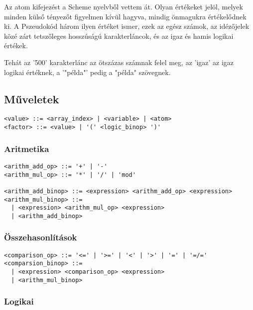 Az atom kifejezést a Scheme nyelvből vettem át. Olyan értékeket jelöl, melyek minden külső tényezőt figyelmen kívül hagyva, mindig önmagukra értékelődnek ki. A Pszeudokód három ilyen értéket ismer, ezek az egész számok, az idézőjelek közé zárt tetszőleges hosszúságú karakterláncok, és az igaz és hamis logikai értékek.

Tehát az '500' karakterlánc az ötszázas számnak felel meg, az 'igaz' az igaz logikai értéknek, a '"példa"' pedig a "példa" szövegnek.

\subsection{Műveletek}

\begin{footnotesize}
\begin{verbatim}
<value> ::= <array_index> | <variable> | <atom>
<factor> ::= <value> | '(' <logic_binop> ')'
\end{verbatim}
\end{footnotesize}

\subsubsection{Aritmetika}

\begin{footnotesize}
\begin{verbatim}
<arithm_add_op> ::= '+' | '-'
<arithm_mul_op> ::= '*' | '/' | 'mod'

<arithm_add_binop> ::= <expression> <arithm_add_op> <expression>
<arithm_mul_binop> ::= 
  | <expression> <arithm_mul_op> <expression> 
  | <arithm_add_binop>
\end{verbatim}
\end{footnotesize}

\subsubsection{Összehasonlítások}

\begin{footnotesize}
\begin{verbatim}
<comparison_op> ::= '<=' | '>=' | '<' | '>' | '=' | '=/='
<comparsion_binop> ::= 
  | <expression> <comparison_op> <expression>
  | <arithm_mul_binop>
\end{verbatim}
\end{footnotesize}

\subsubsection{Logikai}

